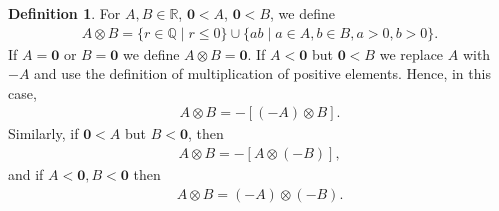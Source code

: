 \documentclass[11pt]{article}
\newcommand{\bbQ}{\mathbb{Q}}
\newcommand{\bbR}{\mathbb{R}}
\theoremstyle{definition}
\newtheorem{definition}[theorem]{Definition}
\numberwithin{equation}{subsection}
\begin{document}
\begin{definition}
	For $A,B\in\bbR$, $\mathbf{0}<A$, $\mathbf{0}<B$, we define
	\begin{align*}
		A \otimes B = \{r \in \bbQ \mid r \leq 0\} \cup \{ab \mid a\in A, b\in B, a > 0, b > 0\}.
	\end{align*}
	If $A = \mathbf{0}$ or $B = \mathbf{0}$ we define $A \otimes B = \mathbf{0}$.
	If $A<\mathbf{0}$ but $\mathbf{0}<B$ we replace $A$ with $-A$ and use the definition of multiplication of positive elements. Hence, in this case,
	\begin{align*}
		A\otimes B=-[(-A)\otimes B].
	\end{align*}
	Similarly, if $\mathbf{0}<A$ but $B<\mathbf{0}$, then 
	\begin{align*}
		A\otimes B=-[A\otimes (-B)],
	\end{align*}
	and 
	if $A<\mathbf{0}, B<\mathbf{0}$ then
	\begin{align*}
		A \otimes B= (-A) \otimes (-B).
	\end{align*}
\end{definition}
\end{document}
